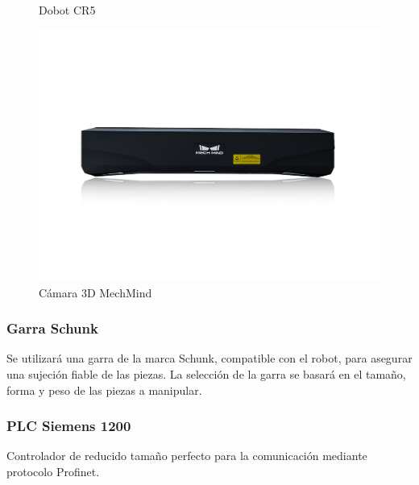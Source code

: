 \documentclass[12pt, a4paper]{article}
\begin{document}
\begin{figure}[h!]
\begin{minipage}{0.45\textwidth}
        \caption{Dobot CR5}
        \label{fig:dobot}
    \end{minipage}\hfill
    \begin{minipage}{0.45\textwidth}
        \centering
        \includegraphics[width=\textwidth]{mechmind.png}
        \caption{Cámara 3D MechMind}
        \label{fig:mechmind}
    \end{minipage}
\end{figure}

\subsubsection{Garra Schunk}
Se utilizará una garra de la marca Schunk, compatible con el robot, para asegurar una sujeción fiable de las piezas. La selección de la garra se basará en el tamaño, forma y peso de las piezas a manipular.

\subsubsection{PLC Siemens 1200}
Controlador de reducido tamaño perfecto para la comunicación mediante protocolo Profinet.
\end{document}
